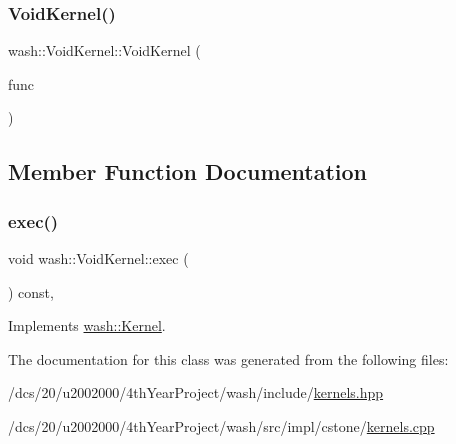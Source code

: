 \subsubsection{\texorpdfstring{Void\+Kernel()}{VoidKernel()}}
{\footnotesize\ttfamily wash\+::\+Void\+Kernel\+::\+Void\+Kernel (\begin{DoxyParamCaption}\item[{const \mbox{\hyperlink{namespacewash_a7de7a4195ce994df4dd54ff86e3fff20}{Void\+FuncT}}}]{func }\end{DoxyParamCaption})\hspace{0.3cm}{\ttfamily [inline]}}



\subsection{Member Function Documentation}
\mbox{\label{classwash_1_1VoidKernel_a2a271788509bac47a96dbbecd7fbe90e}} 
\subsubsection{\texorpdfstring{exec()}{exec()}}
{\footnotesize\ttfamily void wash\+::\+Void\+Kernel\+::exec (\begin{DoxyParamCaption}{ }\end{DoxyParamCaption}) const\hspace{0.3cm}{\ttfamily [override]}, {\ttfamily [virtual]}}



Implements \mbox{\hyperlink{classwash_1_1Kernel_a0ec211840402ce975997b22136f16e39}{wash\+::\+Kernel}}.



The documentation for this class was generated from the following files\+:\begin{DoxyCompactItemize}
\item 
/dcs/20/u2002000/4th\+Year\+Project/wash/include/\mbox{\hyperlink{kernels_8hpp}{kernels.\+hpp}}\item 
/dcs/20/u2002000/4th\+Year\+Project/wash/src/impl/cstone/\mbox{\hyperlink{cstone_2kernels_8cpp}{kernels.\+cpp}}\end{DoxyCompactItemize}
